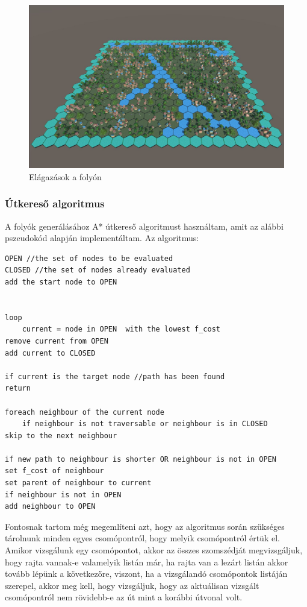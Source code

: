\begin{figure}[h]
\centering
\includegraphics[scale=0.3]{kepek/img11_4_3_2.JPG}
\caption{Elágazások a folyón}
\label{fig:img11_4_3_2}
\end{figure}

\newpage
\subsubsection{Útkereső algoritmus}

A folyók generálásához A* útkereső algoritmust használtam, amit az alábbi pszeudokód alapján implementáltam.
\newline
\newline Az algoritmus: 

\begin{verbatim}
OPEN //the set of nodes to be evaluated
CLOSED //the set of nodes already evaluated
add the start node to OPEN


loop
	current = node in OPEN  with the lowest f_cost
remove current from OPEN
add current to CLOSED

if current is the target node //path has been found
return

foreach neighbour of the current node
	if neighbour is not traversable or neighbour is in CLOSED
skip to the next neighbour

if new path to neighbour is shorter OR neighbour is not in OPEN
set f_cost of neighbour
set parent of neighbour to current
if neighbour is not in OPEN
add neighbour to OPEN
\end{verbatim}

\noindent Fontosnak tartom még megemlíteni azt, hogy az algoritmus során szükséges tárolnunk minden egyes csomópontról, hogy melyik csomópontról értük el. Amikor vizsgálunk egy csomópontot, akkor az összes szomszédját megvizsgáljuk, hogy rajta vannak-e valamelyik listán már, ha rajta van a lezárt listán akkor tovább lépünk a következőre, viszont, ha a vizsgálandó csomópontok listáján szerepel, akkor meg kell, hogy vizsgáljuk, hogy az aktuálisan vizsgált csomópontról nem rövidebb-e az út mint a korábbi útvonal volt.

